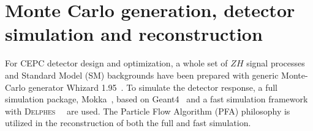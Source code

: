 \documentclass[a4paper,10pt,twoside]{cpc-hepnp}
\begin{document}


\section{Monte Carlo generation, detector simulation and reconstruction \label{sec:simulation}}

For CEPC detector design and optimization, a whole set of $ZH$ signal processes and Standard Model (SM) backgrounds have been prepared\cite{ref:cepccpc} with generic Monte-Carlo generator {\sf Whizard 1.95}{~\cite{ref:whizard}}.  To simulate the detector response, a full simulation package, Mokka{~\cite{ref:mokka}}, based on Geant4{~\cite{ref:geant4}} and a fast simulation framework with {\textsc{Delphes}~}{~\cite{ref:delphes}} are used.  The Particle Flow Algorithm (PFA) philosophy is utilized in the reconstruction of both the full and fast simulation.
\end{document}
